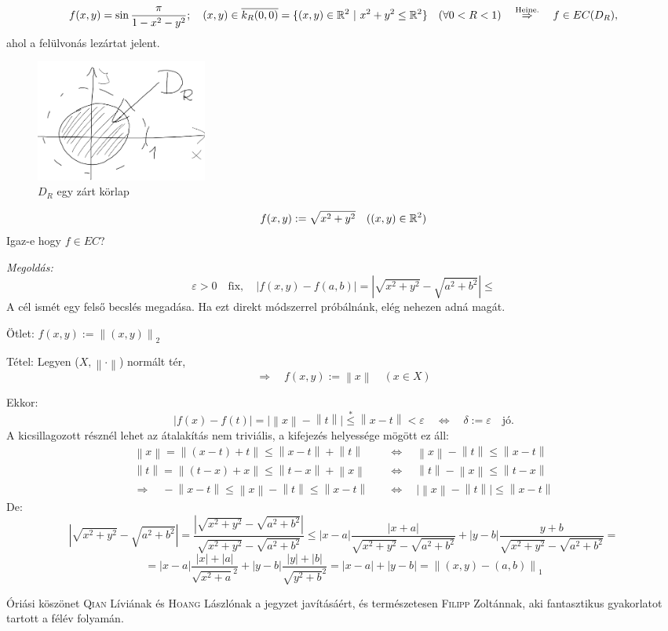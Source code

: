 \documentclass[a4paper,11.5pt]{article}
\newcommand{\norm}[1]{\left\lVert#1\right\rVert}
\begin{document}
	\begin{note}
		\[ f(x,y)=\sin\frac{\pi}{1-x^2-y^2};\quad (x,y)\in\overline{k_R(0,0)}=\{ (x,y)\in\mathbb{R}^2\ | \ x^2+y^2\leq \mathbb{R}^2 \}\quad (\forall 0<R<1)\quad \overset{\text{Heine.}}{\Rightarrow}\quad f\in EC(D_R), \]
		ahol a felülvonás lezártat jelent.
		\begin{figure}[H]
			\centering
			\includegraphics[height=4cm]{../2zh/kepek/55.png}
			\caption{$D_R$ egy zárt körlap}
		\end{figure}
	\end{note}
	\begin{task}
		\[ f(x,y):=\sqrt{x^2+y^2}\quad ((x,y)\in\mathbb{R}^2) \]
		Igaz-e hogy $f\in EC$?
		
		\textit{Megoldás:} 
		\[ \varepsilon>0\quad \text{fix},\quad |f(x,y)-f(a,b)|=|\sqrt{x^2+y^2}-\sqrt{a^2+b^2}|\leq \]
		A cél ismét egy felső becslés megadása. Ha ezt direkt módszerrel próbálnánk, elég nehezen adná magát.
		
		Ötlet: $f(x,y):=\norm{(x,y)}_2$
		
		Tétel: Legyen ($X,\norm{\cdot}$) normált tér,
		\[ \Rightarrow\quad f(x,y):=\norm{x}\quad (x\in X) \]
		
		Ekkor:
		\[ |f(x)-f(t)|=\big|\norm{x}-\norm{t}\big|\overset{*}{\leq}\norm{x-t}<\varepsilon\quad \Leftrightarrow\quad \delta:=\varepsilon\quad \text{jó.} \]
		A kicsillagozott résznél lehet az átalakítás nem triviális, a kifejezés helyessége mögött ez áll:
		\begin{align*}
			\norm{x}=\norm{(x-t)+t}\leq\norm{x-t}+\norm{t}\quad& \Leftrightarrow\quad \norm{x}-\norm{t}\leq\norm{x-t}\\
			\norm{t}=\norm{(t-x)+x}\leq\norm{t-x}+\norm{x}\quad& \Leftrightarrow\quad \norm{t}-\norm{x}\leq\norm{t-x}\\
			\Rightarrow\quad -\norm{x-t}\leq\norm{x}-\norm{t}\leq\norm{x-t}\quad& \Leftrightarrow\quad \big|\norm{x}-\norm{t}\big|\leq \norm{x-t}
		\end{align*}
		De:
		\[ \left|\sqrt{x^2+y^2}-\sqrt{a^2+b^2}\right|=\frac{\left|\sqrt{x^2+y^2}-\sqrt{a^2+b^2}\right|}{\sqrt{x^2+y^2}-\sqrt{a^2+b^2}}\leq|x-a|\frac{|x+a|}{\sqrt{x^2+y^2}-\sqrt{a^2+b^2}}+|y-b|\frac{y+b}{\sqrt{x^2+y^2}-\sqrt{a^2+b^2}}= \]
		\[ = |x-a|\frac{|x|+|a|}{\sqrt{x^2 + a}^2}+|y-b|\frac{|y|+|b|}{\sqrt{y^2+b}^2}=|x-a|+|y-b|=\norm{(x,y)-(a,b)}_1 \] 
	\end{task}
	
	\bigskip
	Óriási köszönet \textsc{Qian} Líviának és \textsc{Hoang} Lászlónak a jegyzet javításáért, és természetesen \textsc{Filipp} Zoltánnak, aki fantasztikus gyakorlatot tartott a félév folyamán.
\end{document}
